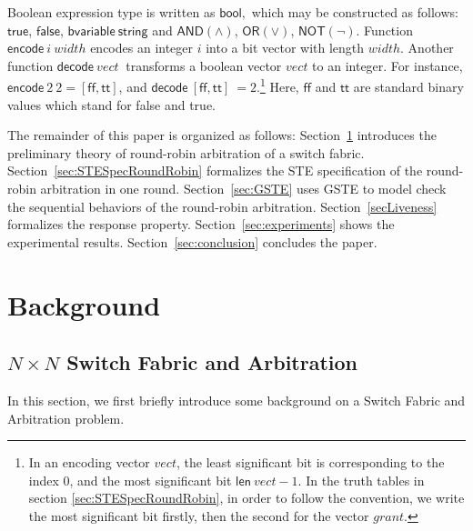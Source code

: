 \documentclass[final]{IEEEtran}
\newcommand{\mathid}[1]{\ensuremath{\mathit{#1}}}
\begin{document}
Boolean expression type is written as $ \mathsf{bool},$ which may be
constructed as follows: $\mathsf{true}$, $\mathsf{false }$,
$\mathsf{bvariable\ string}$ and $\mathsf{AND(\wedge  )}$, $\mathsf{
OR(\vee )}$, $\mathsf{NOT(\lnot)}$.
Function $\mathsf{encode }\ i\ width$  encodes an integer $i$ into a
bit vector with length $width$.  Another function $\mathsf{decode }\
\mathid{vect} \ $  transforms a boolean vector $\mathid{vect}$ to an
integer. For instance, $\mathsf{encode }\ 2\
2=[\mathsf{ff},\mathsf{tt}]$, and $\mathsf{decode }\
[\mathsf{ff},\mathsf{tt}]\
 =2$.\footnote{In an encoding vector
$vect$, the least significant bit is corresponding to the index 0,
and the most significant bit $\mathsf{len}\ vect -1 $. In the truth
tables in section \ref{sec:STESpecRoundRobin}, in order to follow
the convention, we write the most significant bit firstly, then the
second for the vector $grant$. } Here, $\mathsf{ff}$ and
 $\mathsf{tt}$ are standard binary values which stand for false and true.


The remainder of this paper is organized as follows: %
Section~\ref{sec:background} introduces the preliminary theory of
round-robin arbitration of a switch fabric.
Section~\ref{sec:STESpecRoundRobin} formalizes the STE specification
of the round-robin arbitration in one round. Section~\ref{sec:GSTE}
uses GSTE to model check the sequential behaviors of the round-robin
arbitration. Section~\ref{secLiveness} formalizes the response
property. Section~\ref{sec:experiments} shows the experimental
results.
 Section~\ref{sec:conclusion} concludes the paper.

\section{Background}\label{sec:background}

\subsection{$N \times N$ Switch Fabric and Arbitration}

In this section, we first briefly introduce some background on a
Switch Fabric and Arbitration problem.
\end{document}
